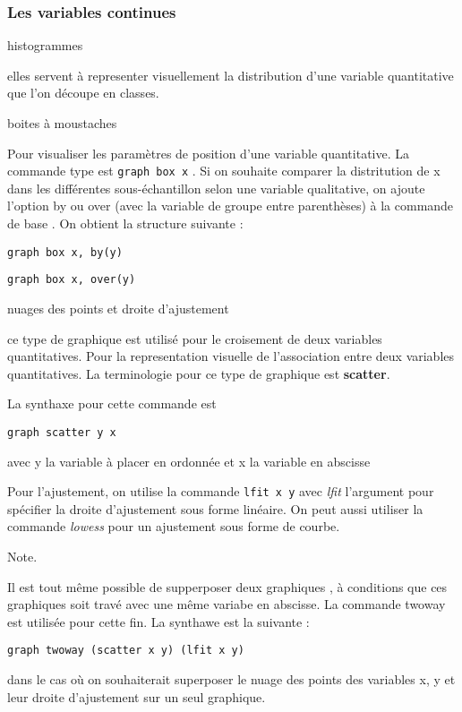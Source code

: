 \documentclass[
]{book}
\begin{document}
\hypertarget{les-variables-continues}{%
\subsubsection{Les variables continues}\label{les-variables-continues}}

histogrammes

elles servent à representer visuellement la distribution d'une variable quantitative que l'on découpe en classes.

boites à moustaches

Pour visualiser les paramètres de position d'une variable quantitative. La commande type est
\texttt{graph\ box\ x} . Si on souhaite comparer la distritution de x dans les différentes sous-échantillon selon une variable qualitative, on ajoute l'option by ou over (avec la variable de groupe entre parenthèses) à la commande de base . On obtient la structure suivante :

\texttt{graph\ box\ x,\ by(y)}

\texttt{graph\ box\ x,\ over(y)}

nuages des points et droite d'ajustement

ce type de graphique est utilisé pour le croisement de deux variables quantitatives. Pour la representation visuelle de l'association entre deux variables quantitatives.
La terminologie pour ce type de graphique est \textbf{scatter}.

La synthaxe pour cette commande est

\texttt{graph\ scatter\ y\ x}

avec y la variable à placer en ordonnée et x la variable en abscisse

Pour l'ajustement, on utilise la commande \texttt{lfit\ x\ y} avec \emph{lfit} l'argument pour spécifier la droite d'ajustement sous forme linéaire. On peut aussi utiliser la commande \emph{lowess} pour un ajustement sous forme de courbe.

Note.

Il est tout même possible de supperposer deux graphiques , à conditions que ces graphiques soit travé avec une même variabe en abscisse. La commande twoway est utilisée pour cette fin. La synthawe est la suivante :

\texttt{graph\ twoway\ (scatter\ x\ y)\ (lfit\ x\ y)}

dans le cas où on souhaiterait superposer le nuage des points des variables x, y et leur droite d'ajustement sur un seul graphique.
\end{document}
